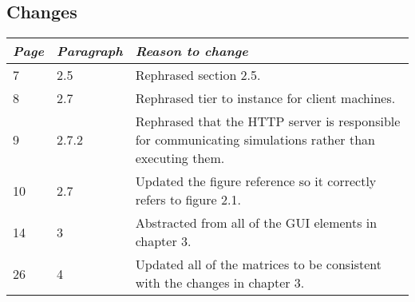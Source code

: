 \subsection*{Changes}
\begin{tabular}{llp{10cm}}
    \toprule
    \emph{Page} & \emph{Paragraph} & \emph{Reason to change} \\
    \midrule
    7 & 2.5 & Rephrased section 2.5.\\
    8 & 2.7 &  Rephrased tier to instance for client machines.\\
    9 & 2.7.2 & Rephrased that the HTTP server is responsible for communicating simulations rather than executing them.\\
    10 & 2.7 & Updated the figure reference so it correctly refers to figure 2.1.\\
    14 & 3 & Abstracted from all of the GUI elements in chapter 3. \\
    26 & 4 & Updated all of the matrices to be consistent with the changes in chapter 3. \\
    \bottomrule
\end{tabular}